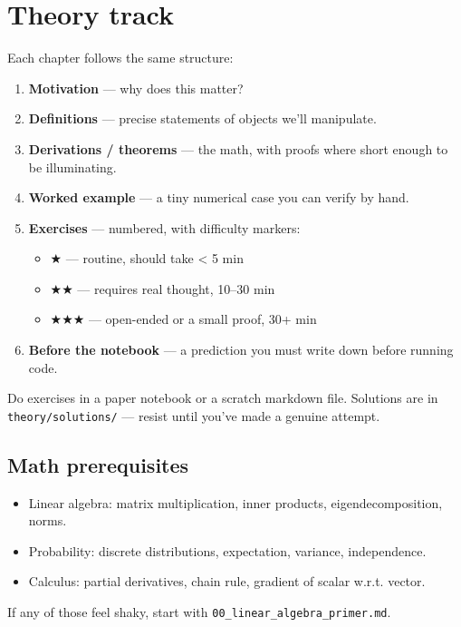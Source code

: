 \documentclass[
]{article}
\author{}
\date{}
\providecommand{\tightlist}{%
  \setlength{\itemsep}{0pt}\setlength{\parskip}{0pt}}
\begin{document}
\hypertarget{theory-track}{%
\section{Theory track}\label{theory-track}}

Each chapter follows the same structure:

\begin{enumerate}
\def\labelenumi{\arabic{enumi}.}
\tightlist
\item
  \textbf{Motivation} --- why does this matter?
\item
  \textbf{Definitions} --- precise statements of objects we'll
  manipulate.
\item
  \textbf{Derivations / theorems} --- the math, with proofs where short
  enough to be illuminating.
\item
  \textbf{Worked example} --- a tiny numerical case you can verify by
  hand.
\item
  \textbf{Exercises} --- numbered, with difficulty markers:

  \begin{itemize}
  \tightlist
  \item
    ★ --- routine, should take \textless{} 5 min
  \item
    ★★ --- requires real thought, 10--30 min
  \item
    ★★★ --- open-ended or a small proof, 30+ min
  \end{itemize}
\item
  \textbf{Before the notebook} --- a prediction you must write down
  before running code.
\end{enumerate}

Do exercises in a paper notebook or a scratch markdown file. Solutions
are in \texttt{theory/solutions/} --- resist until you've made a genuine
attempt.

\hypertarget{math-prerequisites}{%
\subsection{Math prerequisites}\label{math-prerequisites}}

\begin{itemize}
\tightlist
\item
  Linear algebra: matrix multiplication, inner products,
  eigendecomposition, norms.
\item
  Probability: discrete distributions, expectation, variance,
  independence.
\item
  Calculus: partial derivatives, chain rule, gradient of scalar w.r.t.
  vector.
\end{itemize}

If any of those feel shaky, start with
\texttt{00\_linear\_algebra\_primer.md}.
\end{document}

